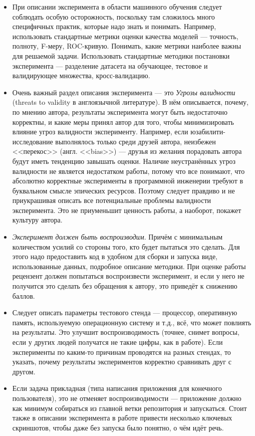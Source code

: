 \documentclass{article}
\newcommand{\todo}[1] {
\begin{center}\textcolor{red}{TODO: #1}\end{center}
}
\begin{document}
\begin{itemize}
    \item При описании эксперимента в области машинного обучения следует соблюдать особую осторожность, поскольку там сложилось много специфичных практик, которые надо знать и понимать. Например, использовать стандартные метрики оценки качества моделей --- точность, полноту, F-меру, ROC-кривую. Понимать, какие метрики наиболее важны для решаемой задачи. Использовать стандартные методики постановки эксперимента --- разделение датасета на обучающее, тестовое и валидирующее множества, кросс-валидацию.
    \item Очень важный раздел описания эксперимента --- это \emph{Угрозы валидности} (threats to validity в англоязычной литературе). В нём описывается, почему, по мнению автора, результаты эксперимента могут быть недостаточно корректны, и какие меры принял автор для того, чтобы минимизировать влияние угроз валидности эксперименту. Например, если юзабилити-исследование выполнялось только среди друзей автора, неизбежен <<перекос>> (англ. <<bias>>) --- друзья из желания порадовать автора будут иметь тенденцию завышать оценки. Наличие неустранённых угроз валидности не является недостатком работы, потому что все понимают, что абсолютно корректные эксперименты в программной инженерии требуют в буквальном смысле эпических ресурсов. Поэтому следует правдиво и не приукрашивая описать все потенциальные проблемы валидности эксперимента. Это не приуменьшит ценность работы, а наоборот, покажет культуру автора.
    \item \emph{Эксперимент должен быть воспроизводим}. Причём с минимальным количеством усилий со стороны того, кто будет пытаться это сделать. Для этого надо предоставить код в удобном для сборки и запуска виде, использованные данных, подробное описание методики. При оценке работы рецензент должен попытаться воспроизвести эксперимент, и если у него не получится это сделать без обращения к автору, это приведёт к снижению баллов.
    \item Следует описать параметры тестового стенда --- процессор, оперативную память, используемую операционную систему и т.д., всё, что может повлиять на результаты. Это улучшит воспроизводимость (точнее, снимет вопросы, если у других людей получатся не такие цифры, как в работе). Если эксперименты по каким-то причинам проводятся на разных стендах, то указать, почему результаты экспериментов корректно сравнивать друг с другом.
    \item Если задача прикладная (типа написания приложения для конечного пользователя), это не отменяет воспроизводимости --- приложение должно как минимум собираться из главной ветки репозитория и запускаться. Стоит также в описании эксперимента в работе привести несколько ключевых скриншотов, чтобы даже без запуска было понятно, о чём идёт речь.

\end{itemize}
\end{document}
